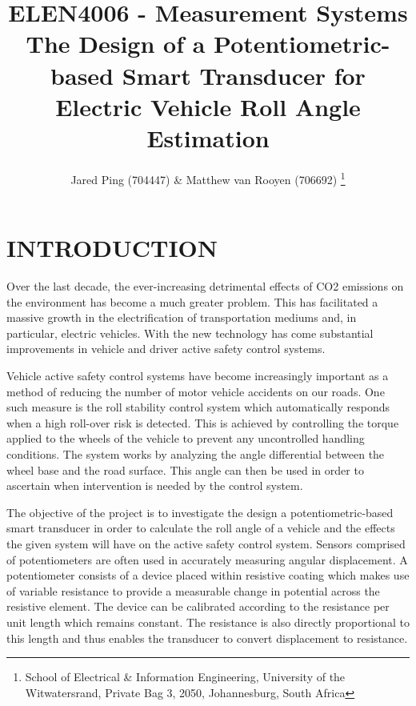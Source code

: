 \documentclass[10pt,twocolumn]{witseiepaper}
\begin{document}
	
	
\title{ELEN4006 - Measurement Systems \\ The Design of a Potentiometric-based Smart Transducer
	for Electric Vehicle Roll Angle Estimation}
	
\author{Jared Ping (704447) \& Matthew van Rooyen (706692)
	\thanks{School of Electrical \& Information Engineering, University of the
			Witwatersrand, Private Bag 3, 2050, Johannesburg, South Africa}
}
	
	
\abstract{}
	
	
	
\maketitle
	
	
\section{INTRODUCTION}

Over the last decade, the ever-increasing detrimental effects of CO2 emissions on the environment has become a much greater problem. This has facilitated a massive growth in the electrification of transportation mediums and, in particular, electric vehicles. With the new technology has come substantial improvements in vehicle and driver active safety control systems.  

Vehicle active safety control systems have become increasingly important as a method of reducing the number of motor vehicle accidents on our roads. One such measure is the roll stability control system which automatically responds when a high roll-over risk is detected. This is achieved by controlling the torque applied to the wheels of the vehicle to prevent any uncontrolled handling conditions. The system works by analyzing the angle differential between the wheel base and the road surface. This angle can then be used in order to ascertain when intervention is needed by the control system.

The objective of the project is to investigate the design a potentiometric-based smart transducer in order to calculate the roll angle of a vehicle and the effects the given system will have on the active safety control system. Sensors comprised of potentiometers are often used in accurately measuring angular displacement\cite{Bentley}. A potentiometer consists of a device placed within resistive coating which makes use of variable resistance to provide a measurable change in potential across the resistive element. The device can be calibrated according to the resistance per unit length which remains constant. The resistance is also directly proportional to this length and thus enables the transducer to convert displacement to resistance. 
\end{document}
